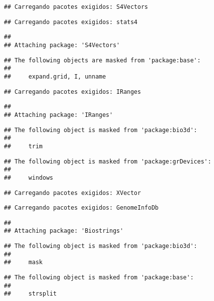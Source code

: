 \documentclass[
]{article}
\begin{document}
\begin{verbatim}
## Carregando pacotes exigidos: S4Vectors
\end{verbatim}

\begin{verbatim}
## Carregando pacotes exigidos: stats4
\end{verbatim}

\begin{verbatim}
## 
## Attaching package: 'S4Vectors'
\end{verbatim}

\begin{verbatim}
## The following objects are masked from 'package:base':
## 
##     expand.grid, I, unname
\end{verbatim}

\begin{verbatim}
## Carregando pacotes exigidos: IRanges
\end{verbatim}

\begin{verbatim}
## 
## Attaching package: 'IRanges'
\end{verbatim}

\begin{verbatim}
## The following object is masked from 'package:bio3d':
## 
##     trim
\end{verbatim}

\begin{verbatim}
## The following object is masked from 'package:grDevices':
## 
##     windows
\end{verbatim}

\begin{verbatim}
## Carregando pacotes exigidos: XVector
\end{verbatim}

\begin{verbatim}
## Carregando pacotes exigidos: GenomeInfoDb
\end{verbatim}

\begin{verbatim}
## 
## Attaching package: 'Biostrings'
\end{verbatim}

\begin{verbatim}
## The following object is masked from 'package:bio3d':
## 
##     mask
\end{verbatim}

\begin{verbatim}
## The following object is masked from 'package:base':
## 
##     strsplit
\end{verbatim}
\end{document}
